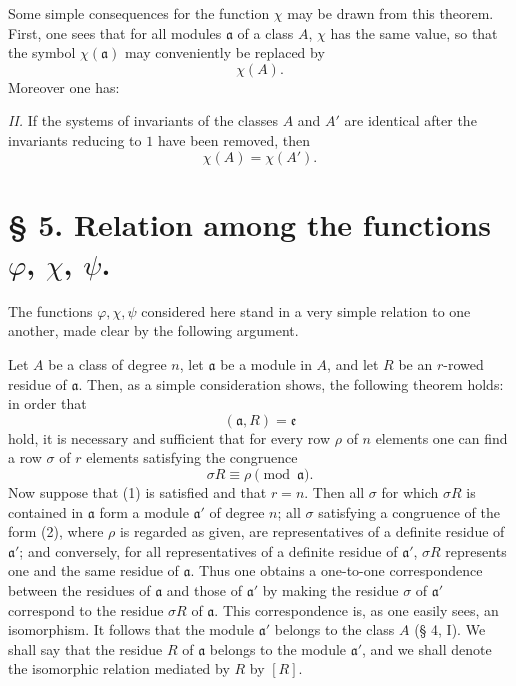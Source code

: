 Some simple consequences for the function $\chi$ may be drawn from this theorem. First, one sees that for all modules $\mathfrak a$ of a class $A$, $\chi$ has the same value, so that the symbol $\chi(\mathfrak a)$ may conveniently be replaced by
\[
 \chi(A).
\]
Moreover one has:

\emph{II.} If the systems of invariants of the classes $A$ and $A'$ are identical after the invariants reducing to $1$ have been removed, then
\[
 \chi(A)=\chi(A').
\]

\section*{§ 5. Relation among the functions $\varphi$, $\chi$, $\psi$.}

The functions $\varphi,\chi,\psi$ considered here stand in a very simple relation to one another, made clear by the following argument.

Let $A$ be a class of degree $n$, let $\mathfrak a$ be a module in $A$, and let $R$ be an $r$-rowed residue of $\mathfrak a$. Then, as a simple consideration shows, the following theorem holds: in order that
\begin{equation}
 (\mathfrak a,R)=\mathfrak e
\tag{1}
\end{equation}
hold, it is necessary and sufficient that for every row $\rho$ of $n$ elements one can find a row $\sigma$ of $r$ elements satisfying the congruence
\begin{equation}
 \sigma R\equiv\rho\pmod{\mathfrak a}.
\tag{2}
\end{equation}
Now suppose that (1) is satisfied and that $r=n$. Then all $\sigma$ for which $\sigma R$ is contained in $\mathfrak a$ form a module $\mathfrak a'$ of degree $n$; all $\sigma$ satisfying a congruence of the form (2), where $\rho$ is regarded as given, are representatives of a definite residue of $\mathfrak a'$; and conversely, for all representatives of a definite residue of $\mathfrak a'$, $\sigma R$ represents one and the same residue of $\mathfrak a$. Thus one obtains a one-to-one correspondence between the residues of $\mathfrak a$ and those of $\mathfrak a'$ by making the residue $\sigma$ of $\mathfrak a'$ correspond to the residue $\sigma R$ of $\mathfrak a$. This correspondence is, as one easily sees, an isomorphism. It follows that the module $\mathfrak a'$ belongs to the class $A$ (§ 4, I). We shall say that the residue $R$ of $\mathfrak a$ belongs to the module $\mathfrak a'$, and we shall denote the isomorphic relation mediated by $R$ by $[R]$.

